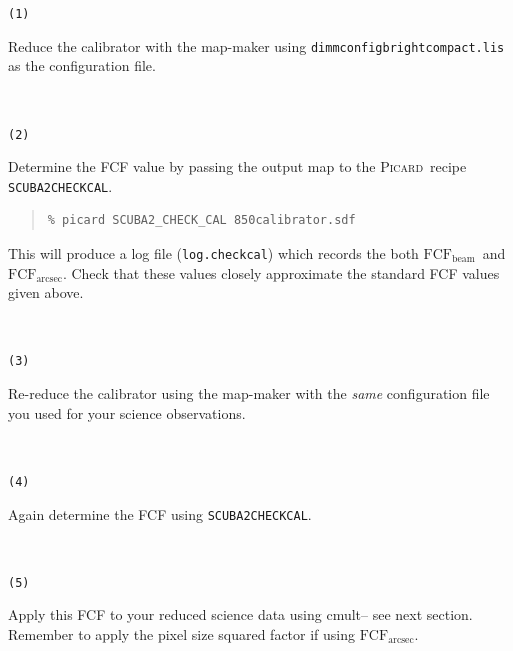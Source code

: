 \documentclass[twoside,11pt]{article}
\newcommand{\xref}[3]{#1}
\renewcommand{\_}{\texttt{\symbol{95}}}
\newenvironment{myquote}{\begin{quote}\begin{small}}{\end{small}\end{quote}}
\newcommand{\fcfb}{$\mathrm{FCF_{beam}}$}
\newcommand{\fcfa}{$\mathrm{FCF_{arcsec}}$}
\newcommand{\picard}{\xref{\textsc{Picard}}{sun265}{}}
\newcommand{\drrecipe}[1]{\texttt{#1}}
\newcommand{\task}[1]{\textsf{#1}}
\newcommand{\cmult}{\xref{\task{cmult}}{sun95}{CMULT}}
\begin{document}
\vspace{1mm}
\begin{minipage}[t]{0.05\linewidth}
\texttt{(1)}
\end{minipage}
\begin{minipage}[t]{0.95\linewidth}
Reduce the calibrator with the map-maker using
\texttt{dimmconfig\_bright\_compact.lis} as the configuration file.
\end{minipage}
\vspace{1mm}\\
\begin{minipage}[t]{0.05\linewidth}
\texttt{(2)}
\end{minipage}
\begin{minipage}[t]{0.95\linewidth}
Determine the FCF value by passing the output map to the
\picard\ recipe \xref{\drrecipe{SCUBA2\_CHECK\_CAL}}{sun265}{SCUBA2_CHECK_CAL}.
\begin{myquote}
\begin{verbatim}
% picard SCUBA2_CHECK_CAL 850calibrator.sdf
\end{verbatim}
\end{myquote}
This will produce a log file (\texttt{log.checkcal}) which records the both
\fcfb\ and \fcfa. Check that these values closely approximate the
standard FCF values given above.
\end{minipage}
\vspace{1mm}\\
\begin{minipage}[t]{0.05\linewidth}
\texttt{(3)}
\end{minipage}
\begin{minipage}[t]{0.95\linewidth}
Re-reduce the calibrator using the map-maker with the \emph{same}
configuration file you used for your science observations.
\end{minipage}
\vspace{1mm}\\
\begin{minipage}[t]{0.05\linewidth}
\texttt{(4)}
\end{minipage}
\begin{minipage}[t]{0.95\linewidth}
Again determine the FCF using \drrecipe{SCUBA2\_CHECK\_CAL}.
\end{minipage}
\vspace{1mm}\\
\begin{minipage}[t]{0.05\linewidth}
\texttt{(5)}
\end{minipage}
\begin{minipage}[t]{0.95\linewidth}
Apply this FCF to your reduced science data using \cmult-- see next
section. Remember to apply the pixel size squared factor if using
\fcfa.
\end{minipage}
\end{document}
